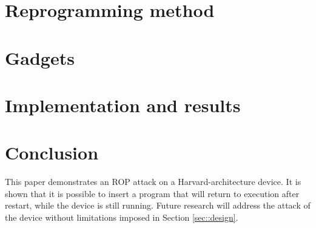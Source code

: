 \section{Reprogramming method} \label{sec::asm} %


\section{Gadgets} \label{sec::gadget} %



\section{Implementation and results}\label{sec::results} %



\section{Conclusion}\label{sec::conclusion} 


	This paper demonstrates an ROP attack on a Harvard-architecture device. It is shown that it is possible to insert a program that will return to execution after restart, while the device is still running. Future research will address the attack of the device without limitations imposed in Section \ref{sec::design}.





